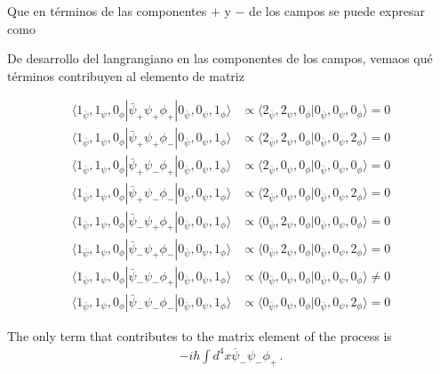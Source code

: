 Que en t\'erminos de las componentes $+$ y $-$ de los campos se puede expresar como


De desarrollo del langrangiano en las componentes de los campos, vemaos qu\'e t\'erminos contribuyen al elemento de matriz

\begin{align*}
 \langle1_{\bar{\psi}},1_{\psi},0_{\phi}|\bar{\psi}_{+}\psi_{+}\phi_{+}|0_{\bar{\psi}},0_{\psi},1_{\phi}\rangle  &\propto  \langle2_{\bar{\psi}},2_{\psi},0_{\phi}|0_{\bar{\psi}},0_{\psi},0_{\phi}\rangle =0\\ 
 \langle1_{\bar{\psi}},1_{\psi},0_{\phi}|\bar{\psi}_{+}\psi_{+}\phi_{-}|0_{\bar{\psi}},0_{\psi},1_{\phi}\rangle  &\propto  \langle2_{\bar{\psi}},2_{\psi},0_{\phi}|0_{\bar{\psi}},0_{\psi},2_{\phi}\rangle =0\\ 
 \langle1_{\bar{\psi}},1_{\psi},0_{\phi}|\bar{\psi}_{+}\psi_{-}\phi_{+}|0_{\bar{\psi}},0_{\psi},1_{\phi}\rangle  &\propto  \langle2_{\bar{\psi}},0_{\psi},0_{\phi}|0_{\bar{\psi}},0_{\psi},0_{\phi}\rangle =0\\ 
 \langle1_{\bar{\psi}},1_{\psi},0_{\phi}|\bar{\psi}_{+}\psi_{-}\phi_{-}|0_{\bar{\psi}},0_{\psi},1_{\phi}\rangle  &\propto  \langle2_{\bar{\psi}},0_{\psi},0_{\phi}|0_{\bar{\psi}},0_{\psi},2_{\phi}\rangle =0\\ 
 \langle1_{\bar{\psi}},1_{\psi},0_{\phi}|\bar{\psi}_{-}\psi_{+}\phi_{+}|0_{\bar{\psi}},0_{\psi},1_{\phi}\rangle  &\propto  \langle0_{\bar{\psi}},2_{\psi},0_{\phi}|0_{\bar{\psi}},0_{\psi},0_{\phi}\rangle =0\\ 
 \langle1_{\bar{\psi}},1_{\psi},0_{\phi}|\bar{\psi}_{-}\psi_{+}\phi_{-}|0_{\bar{\psi}},0_{\psi},1_{\phi}\rangle  &\propto  \langle0_{\bar{\psi}},2_{\psi},0_{\phi}|0_{\bar{\psi}},0_{\psi},2_{\phi}\rangle =0\\ 
 \langle1_{\bar{\psi}},1_{\psi},0_{\phi}|\bar{\psi}_{-}\psi_{-}\phi_{+}|0_{\bar{\psi}},0_{\psi},1_{\phi}\rangle  &\propto  \langle0_{\bar{\psi}},0_{\psi},0_{\phi}|0_{\bar{\psi}},0_{\psi},0_{\phi}\rangle \neq 0\\
 \langle1_{\bar{\psi}},1_{\psi},0_{\phi}|\bar{\psi}_{-}\psi_{-}\phi_{-}|0_{\bar{\psi}},0_{\psi},1_{\phi}\rangle  &\propto  \langle0_{\bar{\psi}},0_{\psi},0_{\phi}|0_{\bar{\psi}},0_{\psi},2_{\phi}\rangle =0
\end{align*}


The only term that contributes to the matrix element of the process is
\begin{align}
  \label{eq:97}
  -i h \int d^4x\overline{\psi}_-\psi_-\phi_+\,.
\end{align}

